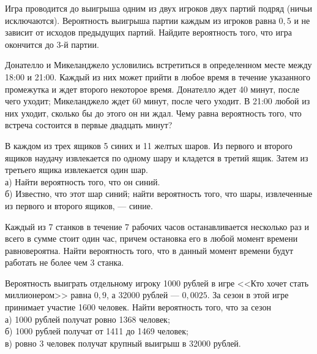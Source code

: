 \newpage\setcounter{zad}{0}



\begin{zkrW}{20}\noindent 
	Игра проводится до выигрыша одним из двух игроков двух партий подряд (ничьи исключаются). Вероятность выигрыша партии каждым из игроков равна $0{,}5$ и не зависит от исходов предыдущих партий. Найдите вероятность того, что игра окончится до 3-й партии.
 
\end{zkrW}

\begin{zkrW}{20}\noindent 
	Донателло и Микеланджело условились встретиться в определенном месте между 18:00 и 21:00. Каждый из них может прийти в любое время в течение указанного промежутка и ждет второго некоторое время. Донателло ждет 40 минут, после чего уходит; Микеланджело ждет 60 минут, после чего уходит. В 21:00 любой из них уходит, сколько бы до этого он ни ждал. Чему равна вероятность того, что встреча состоится в первые двадцать минут?
 
\end{zkrW}

\begin{zkrW}{20}\noindent 
	В каждом из трех ящиков 5 синих и 11 желтых шаров. Из первого и второго ящиков наудачу извлекается по одному шару и кладется в третий ящик. Затем из третьего ящика извлекается один шар. \\ \indent а) Найти вероятность того, что он синий. \\ \indent б) Известно, что этот шар синий; найти вероятность того, что шары, извлеченные из первого и второго ящиков, --- синие.
 
\end{zkrW}

\begin{zkrW}{20}\noindent 
	Каждый из 7 станков в течение 7 рабочих часов останавливается несколько раз и всего в сумме стоит один час, причем остановка его в любой момент времени равновероятна. Найти вероятность того, что в данный момент времени будут работать не более чем 3 станка.
 
\end{zkrW}

\begin{zkrW}{20}\noindent 
	Вероятность выиграть отдельному игроку 1000 рублей в игре <<Кто хочет стать миллионером>> равна $0{,}9$, а 32000 рублей --- $0{,}0025$. За сезон в этой игре принимает участие 1600 человек. Найти вероятность того, что за сезон \\ \indent а) 1000 рублей получат ровно 1368 человек; \\ \indent б) 1000 рублей получат от 1411 до 1469 человек; \\ \indent в) ровно 3 человек получат крупный выигрыш в 32000 рублей.
 
\end{zkrW}

